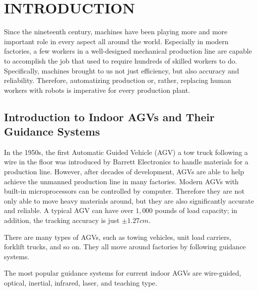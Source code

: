 %
%
%


\chapter{INTRODUCTION}

Since the nineteenth century, machines have been playing more and more important role in every aspect all around the world. Especially in modern factories, a few workers in a well-designed mechanical production line are capable to accomplish the job that used to require hundreds of skilled workers to do. Specifically, machines brought to us not just efficiency, but also accuracy and reliability. Therefore, automatizing production or, rather, replacing human workers with robots is imperative for every production plant.


\section{Introduction to Indoor AGVs and Their Guidance Systems}

In the 1950s, the first Automatic Guided Vehicle (AGV) a tow truck following a wire in the floor was introduced by Barrett Electronics to handle materials for a production line. \cite{olmi2011traffic} However, after decades of development, AGVs are able to help achieve the unmanned production line in many factories. Modern AGVs with built-in microprocessors can be controlled by computer. Therefore they are not only able to move heavy materials around, but they are also significantly accurate and reliable. A typical AGV can have over $1,000$ pounds of load capacity; in addition, the tracking accuracy is just $\pm 1.27 cm$. \cite{KESH} 
		
There are many types of AGVs, such as towing vehicles, unit load carriers, forklift trucks, and so on. They all move around factories by following guidance systems.  
		
The most popular guidance systems for current indoor AGVs are wire-guided, optical, inertial, infrared, laser, and teaching type. \cite{KESH}

